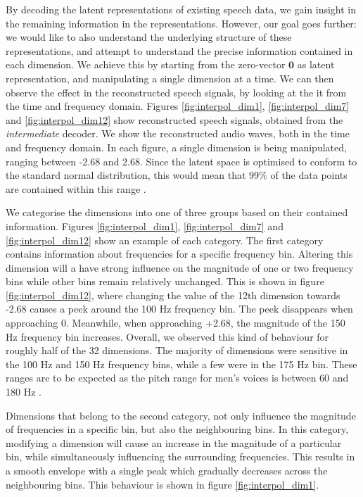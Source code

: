 		
		
		By decoding the latent representations of existing speech data, we gain insight in the remaining information in the representations. However, our goal goes further: we would like to also understand the underlying structure of these representations, and attempt to understand the precise information contained in each dimension. We achieve this by starting from the zero-vector $\textbf{0}$ as latent representation, and manipulating a single dimension at a time. We can then observe the effect in the reconstructed speech signals, by looking at the it from the time and frequency domain. Figures \ref{fig:interpol_dim1}, \ref{fig:interpol_dim7} and \ref{fig:interpol_dim12} show reconstructed speech signals, obtained from the \textit{intermediate} decoder. We show the reconstructed audio waves, both in the time and frequency domain. In each figure, a single dimension is being manipulated, ranging between -2.68 and 2.68. Since the latent space is optimised to conform to the standard normal distribution, this would mean that 99\% of the data points are contained within this range \citep{bhandariStandardNormalDistribution2020}.
		
		We categorise the dimensions into one of three groups based on their contained information. Figures \ref{fig:interpol_dim1}, \ref{fig:interpol_dim7} and \ref{fig:interpol_dim12} show an example of each category. The first category contains information about frequencies for a specific frequency bin. Altering this dimension will a have strong influence on the magnitude of one or two frequency bins while other bins remain relatively unchanged. This is shown in figure \ref{fig:interpol_dim12}, where changing the value of the 12th dimension towards -2.68 causes a peek around the 100 Hz frequency bin. The peek disappears when approaching 0. Meanwhile, when approaching +2.68, the magnitude of the 150 Hz frequency bin increases. Overall, we observed this kind of behaviour for roughly half of the 32 dimensions. The majority of dimensions were sensitive in the 100 Hz and 150 Hz frequency bins, while a few were in the 175 Hz bin. These ranges are to be expected as the pitch range for men's voices is between 60 and 180 Hz \citep{rePreferencesVeryLow2012}.
		
		Dimensions that belong to the second category, not only influence the magnitude of frequencies in a specific bin, but also the neighbouring bins. In this category, modifying a dimension will cause an increase in the magnitude of a particular bin, while simultaneously influencing the surrounding frequencies. This results in a smooth envelope with a single peak which gradually decreases across the neighbouring bins. This behaviour is shown in figure \ref{fig:interpol_dim1}.
		
